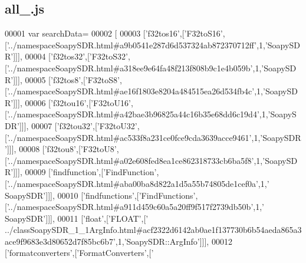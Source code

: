 \subsection{all\+\_.\+js}
\label{all__5_8js_source}

\begin{DoxyCode}
00001 var searchData=
00002 [
00003   [\textcolor{stringliteral}{'f32tos16'},[\textcolor{stringliteral}{'F32toS16'},[\textcolor{stringliteral}{'../namespaceSoapySDR.html#a9b0541e287d6d537324ab872370712ff'},1,\textcolor{stringliteral}{'SoapySDR'}]]],
00004   [\textcolor{stringliteral}{'f32tos32'},[\textcolor{stringliteral}{'F32toS32'},[\textcolor{stringliteral}{'../namespaceSoapySDR.html#a318ee9e64fa48f213f808b9c1e4b059b'},1,\textcolor{stringliteral}{'SoapySDR'}]]],
00005   [\textcolor{stringliteral}{'f32tos8'},[\textcolor{stringliteral}{'F32toS8'},[\textcolor{stringliteral}{'../namespaceSoapySDR.html#ae16f1803e8204a484515ea26d534fb4c'},1,\textcolor{stringliteral}{'SoapySDR'}]]],
00006   [\textcolor{stringliteral}{'f32tou16'},[\textcolor{stringliteral}{'F32toU16'},[\textcolor{stringliteral}{'../namespaceSoapySDR.html#a42bae3b96825a44c16b35e68dd6c19d4'},1,\textcolor{stringliteral}{'SoapySDR'}]]],
00007   [\textcolor{stringliteral}{'f32tou32'},[\textcolor{stringliteral}{'F32toU32'},[\textcolor{stringliteral}{'../namespaceSoapySDR.html#ac533f8a231ce0fce9cda3639acce9461'},1,\textcolor{stringliteral}{'SoapySDR'}]]],
00008   [\textcolor{stringliteral}{'f32tou8'},[\textcolor{stringliteral}{'F32toU8'},[\textcolor{stringliteral}{'../namespaceSoapySDR.html#a02e608fed8ea1ce862318733cb6ba5f8'},1,\textcolor{stringliteral}{'SoapySDR'}]]],
00009   [\textcolor{stringliteral}{'findfunction'},[\textcolor{stringliteral}{'FindFunction'},[\textcolor{stringliteral}{'../namespaceSoapySDR.html#aba00ba8d822a1d5a55b74805de1cef0a'},1,\textcolor{stringliteral}{'
      SoapySDR'}]]],
00010   [\textcolor{stringliteral}{'findfunctions'},[\textcolor{stringliteral}{'FindFunctions'},[\textcolor{stringliteral}{'../namespaceSoapySDR.html#a911d459c60a5a20ff9f517f2739db50b'},1,\textcolor{stringliteral}{'
      SoapySDR'}]]],
00011   [\textcolor{stringliteral}{'float'},[\textcolor{stringliteral}{'FLOAT'},[\textcolor{stringliteral}{'
      ../classSoapySDR\_1\_1ArgInfo.html#acf2322d6142ab0ae1f137730b6b54aeda865a3ace9f9683e3d80652d7f85bc6b7'},1,\textcolor{stringliteral}{'SoapySDR::ArgInfo'}]]],
00012   [\textcolor{stringliteral}{'formatconverters'},[\textcolor{stringliteral}{'FormatConverters'},[\textcolor{stringliteral}{'
}
\end{DoxyCode}
